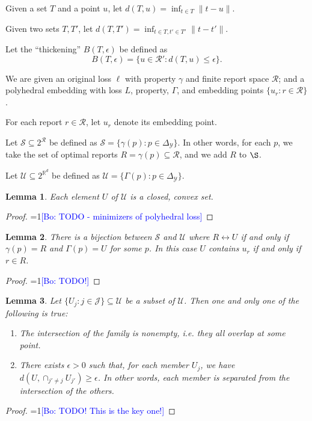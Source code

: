 \documentclass{article}
\newcommand{\Comments}{1}
\newcommand{\mynote}[2]{\ifnum\Comments=1\textcolor{#1}{#2}\fi}
\newcommand{\bo}[1]{\mynote{blue}{[Bo: #1]}}
\newcommand{\reals}{\mathbb{R}}
\newcommand{\R}{\mathcal{R}}
\newcommand{\Y}{\mathcal{Y}}
\newtheorem{lemma}{Lemma}
\begin{document}
Given a set $T$ and a point $u$, let $d(T,u) = \inf_{t \in T} \|t-u\|$.

Given two sets $T,T'$, let $d(T,T') = \inf_{t\in T, t' \in T'} \|t-t'\|$.

Let the ``thickening'' $B(T,\epsilon)$ be defined as
  \[ B(T,\epsilon) = \{u \in \R' : d(T,u) \leq \epsilon \} . \]

We are given an original loss $\ell$ with property $\gamma$ and finite report space $\R$; and a polyhedral embedding with loss $L$, property, $\Gamma$, and embedding points $\{u_r : r \in \R\}$.

For each report $r \in \R$, let $u_r$ denote its embedding point.

Let $\mathcal{S} \subseteq 2^{\R}$ be defined as $\mathcal{S} = \{\gamma(p) : p \in \Delta_{\Y}\}$.
In other words, for each $p$, we take the set of optimal reports $R = \gamma(p) \subseteq \R$, and we add $R$ to $\S$.

Let $\mathcal{U} \subseteq 2^{\reals^d}$ be defined as $\mathcal{U} = \{\Gamma(p) : p \in \Delta_{\Y}\}$.

\begin{lemma} \label{lemma:U-convex-closed}
  Each element $U$ of $\mathcal{U}$ is a closed, convex set.
\end{lemma}
\begin{proof}
  \bo{TODO - minimizers of polyhedral loss}
\end{proof}

\begin{lemma} \label{lemma:U-biject}
  There is a bijection between $\mathcal{S}$ and $\mathcal{U}$ where $R \leftrightarrow U$ if and only if $\gamma(p) = R$ and $\Gamma(p) = U$ for some $p$.
  In this case $U$ contains $u_r$ if and only if $r \in R$.
\end{lemma}
\begin{proof}
  \bo{TODO!}
\end{proof}

\begin{lemma} \label{lemma:U-separated}
  Let $\{U_j : j \in \mathcal{J}\} \subseteq \mathcal{U}$ be a subset of $\mathcal{U}$.
  Then one and only one of the following is true:
  \begin{enumerate}
    \item The intersection of the family is nonempty, i.e. they all overlap at some point.
    \item There exists $\epsilon > 0$ such that, for each member $U_j$, we have $d(U, \cap_{j' \neq j} U_{j'}) \geq \epsilon$.
          In other words, each member is separated from the intersection of the others.
  \end{enumerate}
\end{lemma}
\begin{proof}
  \bo{TODO! This is the key one!}
\end{proof}
\end{document}
